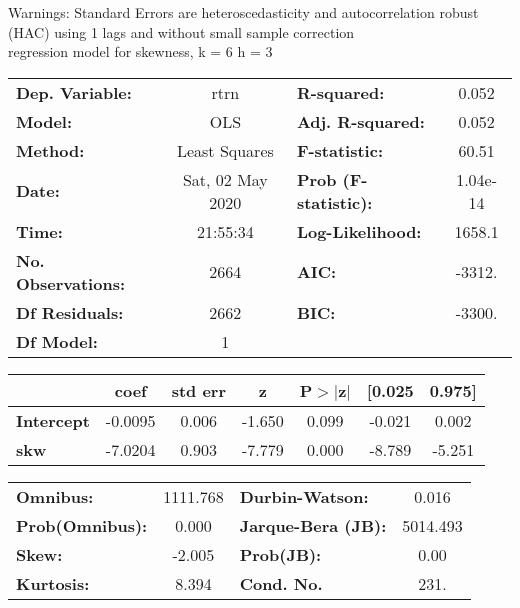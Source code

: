 Warnings: \newline
 [1] Standard Errors are heteroscedasticity and autocorrelation robust (HAC) using 1 lags and without small sample correction\\ 

regression model for skewness, k = 6 h = 3\begin{center}
\begin{tabular}{lclc}
\toprule
\textbf{Dep. Variable:}    &       rtrn       & \textbf{  R-squared:         } &     0.052   \\
\textbf{Model:}            &       OLS        & \textbf{  Adj. R-squared:    } &     0.052   \\
\textbf{Method:}           &  Least Squares   & \textbf{  F-statistic:       } &     60.51   \\
\textbf{Date:}             & Sat, 02 May 2020 & \textbf{  Prob (F-statistic):} &  1.04e-14   \\
\textbf{Time:}             &     21:55:34     & \textbf{  Log-Likelihood:    } &    1658.1   \\
\textbf{No. Observations:} &        2664      & \textbf{  AIC:               } &    -3312.   \\
\textbf{Df Residuals:}     &        2662      & \textbf{  BIC:               } &    -3300.   \\
\textbf{Df Model:}         &           1      & \textbf{                     } &             \\
\bottomrule
\end{tabular}
\begin{tabular}{lcccccc}
                   & \textbf{coef} & \textbf{std err} & \textbf{z} & \textbf{P$> |$z$|$} & \textbf{[0.025} & \textbf{0.975]}  \\
\midrule
\textbf{Intercept} &      -0.0095  &        0.006     &    -1.650  &         0.099        &       -0.021    &        0.002     \\
\textbf{skw}       &      -7.0204  &        0.903     &    -7.779  &         0.000        &       -8.789    &       -5.251     \\
\bottomrule
\end{tabular}
\begin{tabular}{lclc}
\textbf{Omnibus:}       & 1111.768 & \textbf{  Durbin-Watson:     } &    0.016  \\
\textbf{Prob(Omnibus):} &   0.000  & \textbf{  Jarque-Bera (JB):  } & 5014.493  \\
\textbf{Skew:}          &  -2.005  & \textbf{  Prob(JB):          } &     0.00  \\
\textbf{Kurtosis:}      &   8.394  & \textbf{  Cond. No.          } &     231.  \\
\bottomrule
\end{tabular}
\end{center}

